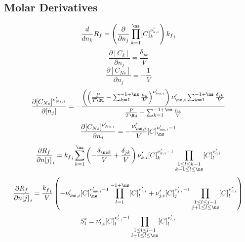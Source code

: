 \documentclass[a4paper,10pt]{article}
\begin{document}
\subsection{Molar Derivatives}
\begin{dmath} \frac{d}{d n_{k}} {R_f} = \left(\frac{\partial}{\partial n_{j}} \prod_{k=1}^{\ns} [C]_{k}^{\nu^{\prime}_{k,i}}\right) {k_f}_{i}\end{dmath} 
\begin{dmath} \frac{\partial [C_k]}{\partial n_j} =\frac{\delta_{j k}}{V}\end{dmath} 
\begin{dmath} \frac{\partial [C_{Ns}]}{\partial n_j} =- \frac{1}{V}\end{dmath} 
\begin{dmath} \frac{\partial [C_{Ns}]^{\nu^{\prime}_{Ns, i}}}{\partial [n_j]} =- \frac{\left(\left(\frac{P}{T \Ru} - \sum_{k=1}^{-1 + \ns} \frac{n_{k}}{V}\right)^{\nu^{\prime}_{\ns,i}}\right) \nu^{\prime}_{\ns,i} \sum_{k=1}^{-1 + \ns} \frac{\delta_{j k}}{V}}{\frac{P}{T \Ru} - \sum_{k=1}^{-1 + \ns} \frac{n_{k}}{V}}\end{dmath} 
\begin{dmath} \frac{\partial [C_{Ns}]^{\nu^{\prime}_{Ns, i}}}{\partial n_j} =- \frac{\nu^{\prime}_{\ns,i}}{V} [C]_{\ns}^{\nu^{\prime}_{\ns,i} - 1}\end{dmath} 
\begin{dmath} \frac{\partial {R_f} }{\partial n[j] }_{i} = {k_f}_{i} \sum_{k=1}^{\ns} \left(- \frac{\delta_{\ns k}}{V} + \frac{\delta_{j k}}{V}\right) \nu^{\prime}_{k,i} [C]_{k}^{\nu^{\prime}_{k,i} - 1} \prod_{\substack{1 \leq l \leq k - 1\\k + 1 \leq l \leq \ns}} [C]_{l}^{\nu^{\prime}_{l,i}}\end{dmath} 
\begin{dmath} \frac{\partial {R_f} }{\partial n[j] }_{i} = \frac{{k_f}_{i}}{V} \left(- \nu^{\prime}_{\ns,i} [C]_{\ns}^{\nu^{\prime}_{\ns,i} - 1} \prod_{l=1}^{-1 + \ns} [C]_{l}^{\nu^{\prime}_{l,i}} + \nu^{\prime}_{j,i} [C]_{j}^{\nu^{\prime}_{j,i} - 1} \prod_{\substack{1 \leq l \leq j - 1\\j + 1 \leq l \leq \ns}} [C]_{l}^{\nu^{\prime}_{l,i}}\right)\end{dmath} 
\begin{dmath} S^{\prime}_{l} = \nu^{\prime}_{l,i} [C]_{l}^{\nu^{\prime}_{l,i} - 1} \prod_{\substack{1 \leq l \leq l - 1\\l + 1 \leq l \leq \ns}} [C]_{l}^{\nu^{\prime}_{l,i}}\end{dmath} 
\end{document}

